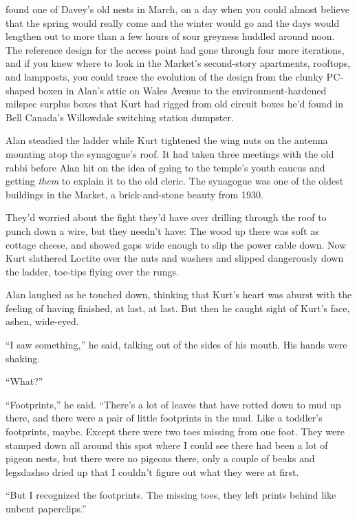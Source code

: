  found one of Davey's old nests in March, on a day when you could
almost believe that the spring would really come and the winter would
go and the days would lengthen out to more than a few hours of sour
greyness huddled around noon.  The reference design for the access
point had gone through four more iterations, and if you knew where to
look in the Market's second-story apartments, rooftops, and lampposts,
you could trace the evolution of the design from the clunky PC-shaped
boxen in Alan's attic on Wales Avenue to the environment-hardened
milspec surplus boxes that Kurt had rigged from old circuit boxes he'd
found in Bell Canada's Willowdale switching station dumpster.

Alan steadied the ladder while Kurt tightened the wing nuts on the
antenna mounting atop the synagogue's roof.  It had taken three
meetings with the old rabbi before Alan hit on the idea of going to
the temple's youth caucus and getting \textit{them} to explain it to
the old cleric.  The synagogue was one of the oldest buildings in the
Market, a brick-and-stone beauty from 1930.

They'd worried about the fight they'd have over drilling through the
roof to punch down a wire, but they needn't have:  The wood up there
was soft as cottage cheese, and showed gaps wide enough to slip the
power cable down.  Now Kurt slathered Loctite over the nuts and
washers and slipped dangerously down the ladder, toe-tips flying over
the rungs.

Alan laughed as he touched down, thinking that Kurt's heart was aburst
with the feeling of having finished, at last, at last.  But then he
caught sight of Kurt's face, ashen, wide-eyed.

``I saw something,'' he said, talking out of the sides of his mouth. 
His hands were shaking.

``What?''

``Footprints,'' he said.  ``There's a lot of leaves that have rotted
down to mud up there, and there were a pair of little footprints in
the mud.  Like a toddler's footprints, maybe.  Except there were two
toes missing from one foot.  They were stamped down all around this
spot where I could see there had been a lot of pigeon nests, but there
were no pigeons there, only a couple of beaks and legsdash{}so dried up
that I couldn't figure out what they were at first.

``But I recognized the footprints.  The missing toes, they left prints
behind like unbent paperclips.''


